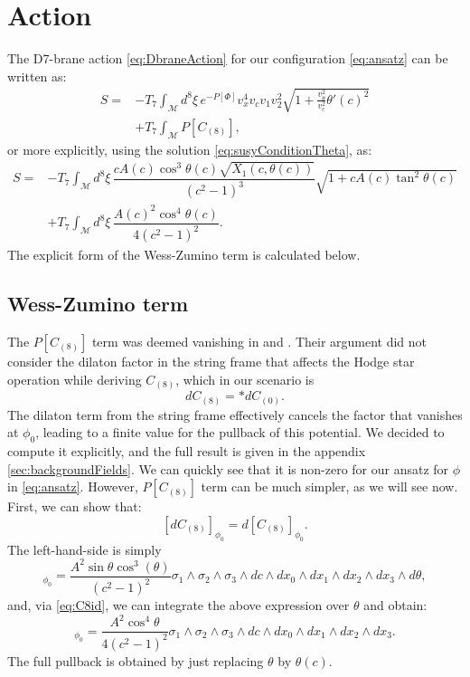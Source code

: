 \section{Action}\label{sec:action}


The D7-brane action \eqref{eq:DbraneAction} for our configuration \eqref{eq:ansatz} can be written as:
\begin{align} \label{eq:ActionWithTheta'}
 S  = & -T_7 \int_\mathcal{M} d^8\xi \, e^{-P[\Phi] } v_x^4 v_c v_1 v_2^2 \sqrt{1+\frac{v_\theta^2}{v_c^2}\theta'(c)^2}  \nonumber \\
      & + T_7\int _\mathcal{M} P[C_{(8)}],
\end{align}
or more explicitly, using the solution \eqref{eq:susyConditionTheta}, as:
\begin{align}\label{eq:ActionWithTheta}
 S = & -T_7 \int_\mathcal{M} d^8\xi \, \dfrac{c A(c) \cos^3\theta (c) \sqrt{X_1(c, \theta(c))}}{\left(c^2-1\right)^3} \sqrt{1+ c A(c) \tan^2\theta(c)} \nonumber \\
     & +T_7\int _\mathcal{M} d^8\xi \, \dfrac{A(c)^2 \cos^4\theta(c)}{4 \left(c^2-1\right)^2}.
\end{align}
The explicit form of the Wess-Zumino term is calculated below.

\subsection{Wess-Zumino term}
The $P[C_{(8)}]$ term was deemed vanishing in \cite{Albash:2011nw} and \cite{Evans:2005ti}. Their argument did not consider the dilaton factor in the string frame that affects the Hodge star operation while deriving $C_{(8)}$, which in our scenario is
\begin{equation}
 dC_{(8)} = \ast dC_{(0)}.
\end{equation}
The dilaton term from the string frame effectively cancels the factor that vanishes at $\phi_0$, leading to a finite value for the pullback of this potential. We decided to compute it explicitly, and the full result is given in the appendix \ref{sec:backgroundFields}. We can quickly see that it is non-zero for our ansatz for $\phi$ in \eqref{eq:ansatz}. However, $P[C_{(8)}]$ term can be much simpler, as we will see now. First, we can show that:
\begin{equation}\label{eq:C8id}
 [d C_{(8)}]_{\phi_0} = d [C_{(8)}]_{\phi_0}.
\end{equation}
The left-hand-side is simply
\begin{equation}
 [d C_{(8)}]_{\phi_0}  = \dfrac{A^2 \sin\theta \cos^3(\theta)}{\left(c^2-1\right)^2} 
\sigma_1 \wedge \sigma_2 \wedge \sigma_3 \wedge dc  \wedge dx_0 \wedge dx_1 \wedge dx_2 \wedge dx_3 \wedge d\theta,
\end{equation}
and, via \eqref{eq:C8id}, we can integrate the above expression over $\theta$ and obtain:
\begin{equation}
[C_{(8)}]_{\phi_0} = \dfrac{A^2 \cos^4\theta}{4 \left(c^2-1\right)^2} \sigma_1 \wedge \sigma_2 \wedge \sigma_3 \wedge dc \wedge dx_0 \wedge dx_1 \wedge dx_2 \wedge dx_3.
\end{equation}
The full pullback is obtained by just replacing $\theta$ by $\theta(c)$.




